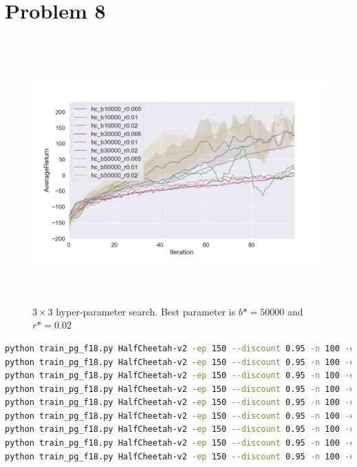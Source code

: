 \documentclass[12pt]{article}
\begin{document}
\section*{Problem 8}
\begin{figure}[H]
  \centering
  \includegraphics[height=4in]{p8_1.png}
  \caption{$3 \times 3$ hyper-parameter search. Best parameter is $b* = 50000$ and $r* = 0.02$}
\end{figure}
\begin{lstlisting}[language=bash]
python train_pg_f18.py HalfCheetah-v2 -ep 150 --discount 0.95 -n 100 -e 3 -l 2 -s 32 -b 10000 -lr 0.005 -rtg --nn_baseline --exp_name hc_b10000_r0.005
python train_pg_f18.py HalfCheetah-v2 -ep 150 --discount 0.95 -n 100 -e 3 -l 2 -s 32 -b 10000 -lr 0.01 -rtg --nn_baseline --exp_name hc_b10000_r0.01
python train_pg_f18.py HalfCheetah-v2 -ep 150 --discount 0.95 -n 100 -e 3 -l 2 -s 32 -b 10000 -lr 0.02 -rtg --nn_baseline --exp_name hc_b10000_r0.02
python train_pg_f18.py HalfCheetah-v2 -ep 150 --discount 0.95 -n 100 -e 3 -l 2 -s 32 -b 30000 -lr 0.005 -rtg --nn_baseline --exp_name hc_b30000_r0.005
python train_pg_f18.py HalfCheetah-v2 -ep 150 --discount 0.95 -n 100 -e 3 -l 2 -s 32 -b 30000 -lr 0.01 -rtg --nn_baseline --exp_name hc_b30000_r0.01
python train_pg_f18.py HalfCheetah-v2 -ep 150 --discount 0.95 -n 100 -e 3 -l 2 -s 32 -b 30000 -lr 0.02 -rtg --nn_baseline --exp_name hc_b30000_r0.02
python train_pg_f18.py HalfCheetah-v2 -ep 150 --discount 0.95 -n 100 -e 3 -l 2 -s 32 -b 50000 -lr 0.005 -rtg --nn_baseline --exp_name hc_b50000_r0.005
python train_pg_f18.py HalfCheetah-v2 -ep 150 --discount 0.95 -n 100 -e 3 -l 2 -s 32 -b 50000 -lr 0.01 -rtg --nn_baseline --exp_name hc_b50000_r0.01
python train_pg_f18.py HalfCheetah-v2 -ep 150 --discount 0.95 -n 100 -e 3 -l 2 -s 32 -b 50000 -lr 0.02 -rtg --nn_baseline --exp_name hc_b50000_r0.02
\end{lstlisting}
\end{document}
